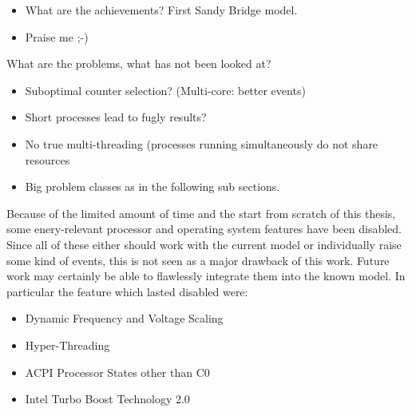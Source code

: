 
\begin{itemize}

\item What are the achievements? First Sandy Bridge model.

\item Praise me ;-)

\end{itemize}


\label{sec:problems}

What are the problems, what has not been looked at?

\begin{itemize}

\item Suboptimal counter selection? (Multi-core: better events)

\item Short processes lead to fugly results?

\item No true multi-threading (processes running simultaneously do not share
resources

\item Big problem classes as in the following sub sections.

\end{itemize}


\label{sec:no-advances-features}

Because of the limited amount of time and the start from scratch of this thesis,
some enery-relevant processor and operating system features have been disabled.
Since all of these either should work with the current model or individually
raise some kind of events, this is not seen as a major drawback of this work.
Future work may certainly be able to flawlessly integrate them into the known
model. In particular the feature which lasted disabled were:

\begin{itemize}

\item Dynamic Frequency and Voltage Scaling \cite{wiki:DVFS}

\item Hyper-Threading \cite{wiki:HT}

\item ACPI Processor States other than C0 \cite{wiki:ACPI}

\item Intel\TReg{} Turbo Boost Technology 2.0 \cite{wiki:IntelTurboBoost}

\end{itemize}


